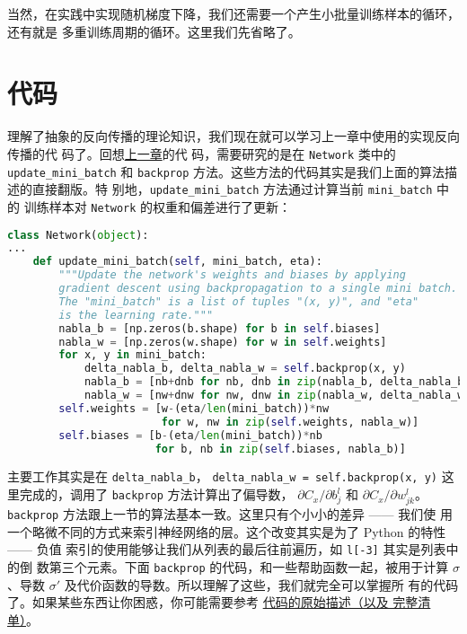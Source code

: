 当然，在实践中实现随机梯度下降，我们还需要一个产生小批量训练样本的循环，还有就是
多重训练周期的循环。这里我们先省略了。

\section{代码}
\label{sec:the_code_for_backpropagation}

理解了抽象的反向传播的理论知识，我们现在就可以学习上一章中使用的实现反向传播的代
码了。回想\hyperref[sec:implementing_our_network_to_classify_digits]{上一章}的代
码，需要研究的是在 \lstinline!Network! 类中的 \lstinline!update_mini_batch! 和
\lstinline!backprop! 方法。这些方法的代码其实是我们上面的算法描述的直接翻版。特
别地，\lstinline!update_mini_batch! 方法通过计算当前 \lstinline!mini_batch! 中的
训练样本对 \lstinline!Network! 的权重和偏差进行了更新：

\begin{lstlisting}[language=Python]
class Network(object):
...
    def update_mini_batch(self, mini_batch, eta):
        """Update the network's weights and biases by applying
        gradient descent using backpropagation to a single mini batch.
        The "mini_batch" is a list of tuples "(x, y)", and "eta"
        is the learning rate."""
        nabla_b = [np.zeros(b.shape) for b in self.biases]
        nabla_w = [np.zeros(w.shape) for w in self.weights]
        for x, y in mini_batch:
            delta_nabla_b, delta_nabla_w = self.backprop(x, y)
            nabla_b = [nb+dnb for nb, dnb in zip(nabla_b, delta_nabla_b)]
            nabla_w = [nw+dnw for nw, dnw in zip(nabla_w, delta_nabla_w)]
        self.weights = [w-(eta/len(mini_batch))*nw
                        for w, nw in zip(self.weights, nabla_w)]
        self.biases = [b-(eta/len(mini_batch))*nb
                       for b, nb in zip(self.biases, nabla_b)]
\end{lstlisting}

主要工作其实是在 \lstinline!delta_nabla_b!，%
\lstinline!delta_nabla_w = self.backprop(x, y)! 这里完成的，调用了
\lstinline!backprop! 方法计算出了偏导数，
$\partial C_x/\partial b_j^l$ 和 $\partial C_x/\partial w_{jk}^l$。
\lstinline!backprop! 方法跟上一节的算法基本一致。这里只有个小小的差异 —— 我们使
用一个略微不同的方式来索引神经网络的层。这个改变其实是为了 Python 的特性 —— 负值
索引的使用能够让我们从列表的最后往前遍历，如 \lstinline!l[-3]!  其实是列表中的倒
数第三个元素。下面 \lstinline!backprop! 的代码，和一些帮助函数一起，被用于计算
$\sigma$、导数 $\sigma'$ 及代价函数的导数。所以理解了这些，我们就完全可以掌握所
有的代码了。如果某些东西让你困惑，你可能需要参考%
\hyperref[sec:implementing_our_network_to_classify_digits]{代码的原始描述（以及
    完整清单）}。

